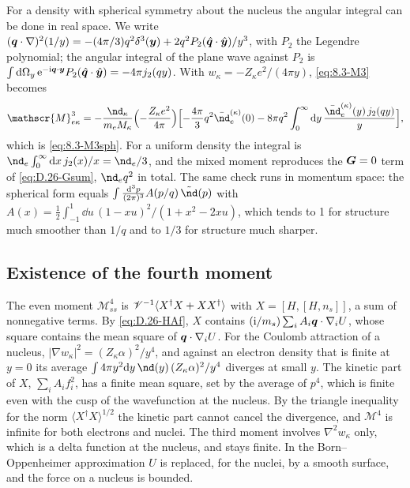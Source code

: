 For a density with spherical symmetry about the nucleus the angular integral can be done in real space. We write $(\bm{q}\cdot\nabla)^2(1/y) = -(4\pi/3)q^2\delta^3(\bm{y}) + 2q^2P_2(\hat{\bm{q}}\cdot\hat{\bm{y}})/y^3$, with $P_2$ the Legendre polynomial; the angular integral of the plane wave against $P_2$ is $\int\mathrm{d}\Omega_y\,\mathrm{e}^{-\mathrm{i}\bm{q}\cdot\bm{y}}P_2(\hat{\bm{q}}\cdot\hat{\bm{y}}) = -4\pi j_2(qy)$. With $w_\kappa = -Z_\kappa e^2/(4\pi y)$, \cref{eq:8.3-M3} becomes
\begin{equation*}
  \mathscr{M}^3_{e\kappa} = -\frac{\nd_\kappa}{m_eM_\kappa}\Bigl(-\frac{Z_\kappa e^2}{4\pi}\Bigr)\Bigl[-\frac{4\pi}{3}q^2\bar\nd_e^{(\kappa)}(0) - 8\pi q^2\int_0^\infty\dd y\,\frac{\bar\nd_e^{(\kappa)}(y)\,j_2(qy)}{y}\Bigr] ,
\end{equation*}
which is \cref{eq:8.3-M3sph}. For a uniform density the integral is $\nd_e\int_0^\infty\dd x\,j_2(x)/x = \nd_e/3$, and the mixed moment reproduces the $\bm{G} = 0$ term of \cref{eq:D.26-Gsum}, $\nd_eq^2$ in total. The same check runs in momentum space: the spherical form equals $\int\frac{\dd^3p}{(2\pi)^3}A(p/q)\,\tilde\nd(p)$ with $A(x) = \frac12\int_{-1}^{1}\dd u\,(1 - xu)^2/(1 + x^2 - 2xu)$, which tends to 1 for structure much smoother than $1/q$ and to $1/3$ for structure much sharper.

\subsection{Existence of the fourth moment}

The even moment $\mathscr{M}^4_{ss}$ is $\mathscr{V}^{-1}\langle X^\dagger X + XX^\dagger\rangle$ with $X = [H, [H, n_s]]$, a sum of nonnegative terms. By \cref{eq:D.26-HAf}, $X$ contains $(\mathrm{i}/m_s)\sum_iA_i\bm{q}\cdot\nabla_iU$, whose square contains the mean square of $\bm{q}\cdot\nabla_iU$. For the Coulomb attraction of a nucleus, $|\nabla w_\kappa|^2 = (Z_\kappa\alpha)^2/y^4$, and against an electron density that is finite at $y = 0$ its average $\int4\pi y^2\dd y\,\nd(y)\,(Z_\kappa\alpha)^2/y^4$ diverges at small $y$. The kinetic part of $X$, $\sum_iA_if_i^2$, has a finite mean square, set by the average of $p^4$, which is finite even with the cusp of the wavefunction at the nucleus. By the triangle inequality for the norm $\langle X^\dagger X\rangle^{1/2}$ the kinetic part cannot cancel the divergence, and $\mathscr{M}^4$ is infinite for both electrons and nuclei. The third moment involves $\nabla^2w_\kappa$ only, which is a delta function at the nucleus, and stays finite. In the Born--Oppenheimer approximation $U$ is replaced, for the nuclei, by a smooth surface, and the force on a nucleus is bounded.

